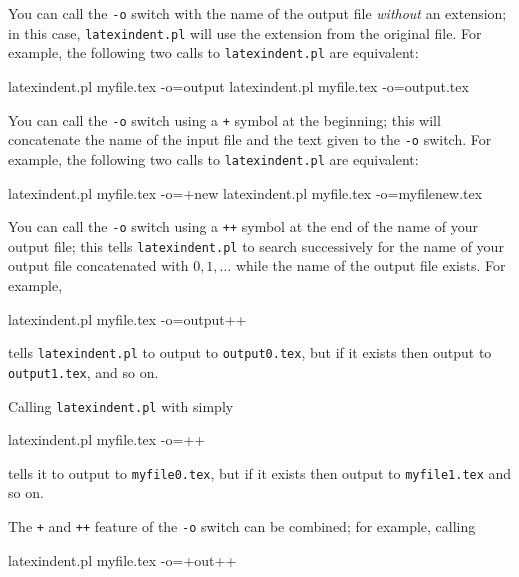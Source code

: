  You can call the \texttt{-o} switch with the name of the output file \emph{without} an
 extension; in  this case,
 \texttt{latexindent.pl} will use the extension from the original file. For example, the
 following two calls to \texttt{latexindent.pl} are equivalent:%

 \begin{commandshell}
latexindent.pl myfile.tex -o=output
latexindent.pl myfile.tex -o=output.tex
\end{commandshell}

 You can call the \texttt{-o} switch using a \texttt{+} symbol at the beginning; this
 will  concatenate the name of the input file
 and the text given to the \texttt{-o} switch. For example, the following two calls to
 \texttt{latexindent.pl} are equivalent:%

 \begin{commandshell}
latexindent.pl myfile.tex -o=+new
latexindent.pl myfile.tex -o=myfilenew.tex
\end{commandshell}

 You can call the \texttt{-o} switch using a \texttt{++} symbol at the end of the name
  of your output file; this tells
 \texttt{latexindent.pl} to search successively for the name of your output file
 concatenated with $0, 1, \ldots$ while the name of the output file exists. For example,%

 \begin{commandshell}
latexindent.pl myfile.tex -o=output++
\end{commandshell}

 tells \texttt{latexindent.pl} to output to \texttt{output0.tex}, but if it exists then
 output to \texttt{output1.tex}, and so on.

 Calling \texttt{latexindent.pl} with simply

 \begin{commandshell}
latexindent.pl myfile.tex -o=++
\end{commandshell}

 tells it to output to \texttt{myfile0.tex}, but if it exists then output to
 \texttt{myfile1.tex} and so on.

 The \texttt{+} and \texttt{++} feature of the \texttt{-o} switch can be combined; for
 example, calling

 \begin{commandshell}
latexindent.pl myfile.tex -o=+out++
\end{commandshell}

